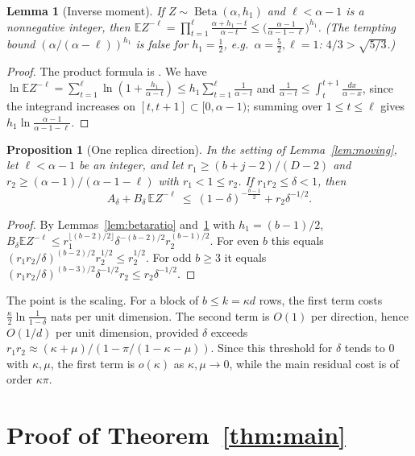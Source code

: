 \documentclass[11pt]{article}
\newtheorem{lemma}[theorem]{Lemma}
\newtheorem{proposition}[theorem]{Proposition}
\theoremstyle{definition}
\theoremstyle{remark}
\newcommand{\E}{\mathbb E}
\DeclareMathOperator{\Beta}{Beta}
\begin{document}
\begin{lemma}[Inverse moment]\label{lem:invmom}
If \(Z\sim\Beta(\alpha,h_1)\) and \(\ell<\alpha-1\) is a nonnegative integer, then
\(\E Z^{-\ell}=\prod_{t=1}^{\ell}\frac{\alpha+h_1-t}{\alpha-t}\le\bigl(\frac{\alpha-1}{\alpha-1-\ell}\bigr)^{h_1}\).
(The tempting bound \((\alpha/(\alpha-\ell))^{h_1}\) is false for \(h_1=\tfrac12\), e.g.\ \(\alpha=\tfrac52,\ell=1\): \(4/3>\sqrt{5/3}\).)
\end{lemma}
\begin{proof}
The product formula is \cite[eq.~(6)]{OAIsub}. We have
\(\ln\E Z^{-\ell}=\sum_{t=1}^\ell\ln(1+\frac{h_1}{\alpha-t})\le h_1\sum_{t=1}^\ell\frac1{\alpha-t}\)
and \(\frac1{\alpha-t}\le\int_{t}^{t+1}\frac{dx}{\alpha-x}\), since the integrand increases on \([t,t+1]\subset[0,\alpha-1)\); summing over \(1\le t\le\ell\) gives \(h_1\ln\frac{\alpha-1}{\alpha-1-\ell}\).
\end{proof}

\begin{proposition}[One replica direction]\label{prop:dir}
In the setting of Lemma~\ref{lem:moving}, let \(\ell<\alpha-1\) be an integer, and let
\(r_1\ge(b+j-2)/(D-2)\) and \(r_2\ge(\alpha-1)/(\alpha-1-\ell)\) with \(r_1<1\le r_2\).
If \(r_1r_2\le\delta<1\), then
\[
 A_\delta+B_\delta\,\E Z^{-\ell}\ \le\ (1-\delta)^{-\frac{b-1}2}+r_2\delta^{-1/2}.
\]
\end{proposition}
\begin{proof}
By Lemmas~\ref{lem:betaratio} and~\ref{lem:invmom} with \(h_1=(b-1)/2\),
\(B_\delta\E Z^{-\ell}\le r_1^{\lfloor (b-2)/2\rfloor}\delta^{-(b-2)/2}r_2^{(b-1)/2}\).
For even \(b\) this equals \((r_1r_2/\delta)^{(b-2)/2}r_2^{1/2}\le r_2^{1/2}\).
For odd \(b\ge3\) it equals \((r_1r_2/\delta)^{(b-3)/2}\delta^{-1/2}r_2\le r_2\delta^{-1/2}\).
\end{proof}

The point is the scaling. For a block of \(b\le k=\kappa d\) rows, the first term
costs \(\frac{\kappa}{2}\ln\frac1{1-\delta}\) nats per unit dimension. The second term
is \(O(1)\) per direction, hence \(O(1/d)\) per unit dimension, provided \(\delta\) exceeds
\(r_1r_2\approx(\kappa+\mu)/(1-\pi/(1-\kappa-\mu))\). Since this threshold for \(\delta\) tends to \(0\) with \(\kappa,\mu\), the first term
is \(o(\kappa)\) as \(\kappa,\mu\to0\), while the main residual cost is of order \(\kappa\pi\).

\section{Proof of Theorem~\ref{thm:main}}\label{sec:proof}
\end{document}
